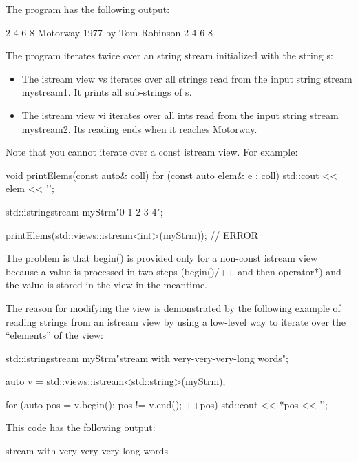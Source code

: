 The program has the following output:

\begin{shell}
2 4 6 8 Motorway 1977 by Tom Robinson
2 4 6 8
\end{shell}

The program iterates twice over an string stream initialized with the string s:

\begin{itemize}
\item
The istream view vs iterates over all strings read from the input string stream mystream1. It prints all sub-strings of s.

\item
The istream view vi iterates over all ints read from the input string stream mystream2. Its reading ends when it reaches Motorway.
\end{itemize}


Note that you cannot iterate over a const istream view. For example:

\begin{cpp}
void printElems(const auto& coll) {
	for (const auto elem& e : coll) {
		std::cout << elem << '\n';
	}
}

std::istringstream myStrm{"0 1 2 3 4"};

printElems(std::views::istream<int>(myStrm)); // ERROR
\end{cpp}

The problem is that begin() is provided only for a non-const istream view because a value is processed in two steps (begin()/++ and then operator*) and the value is stored in the view in the meantime.

The reason for modifying the view is demonstrated by the following example of reading strings from an istream view by using a low-level way to iterate over the “elements” of the view:

\begin{cpp}
std::istringstream myStrm{"stream with very-very-very-long words"};

auto v = std::views::istream<std::string>(myStrm);

for (auto pos = v.begin(); pos != v.end(); ++pos) {
	std::cout << *pos << '\n';
}
\end{cpp}

This code has the following output:

\begin{shell}
stream
with
very-very-very-long
words
\end{shell}


